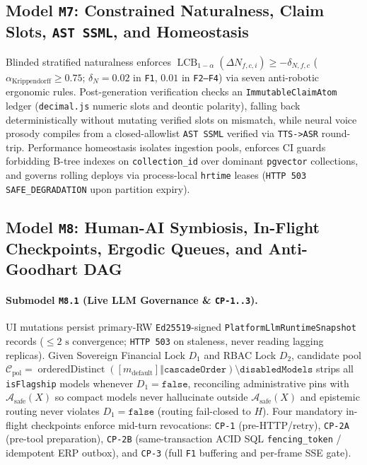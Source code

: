 \documentclass[10pt,twocolumn]{article}
\begin{document}
\subsection{Model \texttt{M7}: Constrained Naturalness, Claim Slots, \texttt{AST SSML}, and Homeostasis}

Blinded stratified naturalness enforces $\operatorname{LCB}_{1-\alpha}(\Delta N_{f,c,i}) \ge -\delta_{N,f,c}$ ($\alpha_{\mathrm{Krippendorff}}\ge 0.75$; $\delta_N=0.02$ in \texttt{F1}, $0.01$ in \texttt{F2--F4}) via seven anti-robotic ergonomic rules. Post-generation verification checks an \texttt{ImmutableClaimAtom} ledger (\texttt{decimal.js} numeric slots and deontic polarity), falling back deterministically without mutating verified slots on mismatch, while neural voice prosody compiles from a closed-allowlist \texttt{AST SSML} verified via \texttt{TTS->ASR} round-trip. Performance homeostasis isolates ingestion pools, enforces CI guards forbidding B-tree indexes on \texttt{collection\_id} over dominant \texttt{pgvector} collections, and governs rolling deploys via process-local \texttt{hrtime} leases (\texttt{HTTP 503 SAFE\_DEGRADATION} upon partition expiry).

\subsection{Model \texttt{M8}: Human-AI Symbiosis, In-Flight Checkpoints, Ergodic Queues, and Anti-Goodhart DAG}

\paragraph{Submodel \texttt{M8.1} (Live LLM Governance \& \texttt{CP-1..3}).}
UI mutations persist primary-RW \texttt{Ed25519}-signed \texttt{PlatformLlmRuntimeSnapshot} records ($\le 2\text{ s}$ convergence; \texttt{HTTP 503} on staleness, never reading lagging replicas). Given Sovereign Financial Lock $D_1$ and RBAC Lock $D_2$, candidate pool $\mathcal{C}_{\mathrm{pol}} = \operatorname{orderedDistinct}([m_{\mathrm{default}}] \mathbin{\Vert} \texttt{cascadeOrder}) \setminus \texttt{disabledModels}$ strips all \texttt{isFlagship} models whenever $D_1=\texttt{false}$, reconciling administrative pins with $\mathcal{A}_{\mathrm{safe}}(X)$ so compact models never hallucinate outside $\mathcal{A}_{\mathrm{safe}}(X)$ and epistemic routing never violates $D_1=\texttt{false}$ (routing fail-closed to $H$). Four mandatory in-flight checkpoints enforce mid-turn revocations: \texttt{CP-1} (pre-HTTP/retry), \texttt{CP-2A} (pre-tool preparation), \texttt{CP-2B} (same-transaction ACID SQL \texttt{fencing\_token} / idempotent ERP outbox), and \texttt{CP-3} (full \texttt{F1} buffering and per-frame SSE gate).
\end{document}
